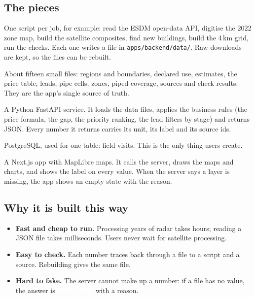 \documentclass[11pt,a4paper]{article}
\newcommand{\pv}[2]{{\setlength{\fboxsep}{1.3pt}\colorbox{#1}{\textcolor{white}{\sffamily\bfseries\fontsize{6.3}{7}\selectfont #2}}}}
\newcommand{\Mis}{\pv{miss}{MISSING}}
\begin{document}
\subsection{The pieces}

\begin{description}[leftmargin=0pt,labelsep=0.5em]
\item[Offline scripts.] One script per job, for example: read the ESDM open-data API, digitise the 2022 zone
  map, build the satellite composites, find new buildings, build the 4\,km grid, run the checks. Each one
  writes a file in \texttt{apps/backend/data/}. Raw downloads are kept, so the files can be rebuilt.
\item[Data files.] About fifteen small files: regions and boundaries, declared use, estimates, the price
  table, leads, pipe cells, zones, piped coverage, sources and check results. They are the app's single
  source of truth.
\item[Server.] A Python FastAPI service. It loads the data files, applies the business rules (the price
  formula, the gap, the priority ranking, the lead filters by stage) and returns JSON. Every number it
  returns carries its unit, its label and its source ids.
\item[Database.] PostgreSQL, used for one table: field visits. This is the only thing users create.
\item[Web app.] A Next.js app with MapLibre maps. It calls the server, draws the maps and charts, and shows
  the label on every value. When the server says a layer is missing, the app shows an empty state with the
  reason.
\end{description}

\subsection{Why it is built this way}

\begin{itemize}
\item \textbf{Fast and cheap to run.} Processing years of radar takes hours; reading a JSON file takes
  milliseconds. Users never wait for satellite processing.
\item \textbf{Easy to check.} Each number traces back through a file to a script and a source. Rebuilding
  gives the same file.
\item \textbf{Hard to fake.} The server cannot make up a number: if a file has no value, the answer is
  \Mis\ with a reason.
\end{itemize}
\end{document}
